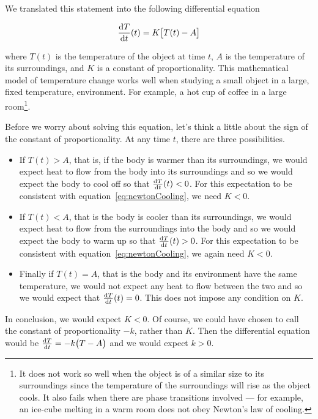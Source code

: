 We translated this statement into the following differential equation
\begin{impeqn}\label{eq:newtonCooling}
 \begin{align*}
\diff{T}{t}(t) = K\big[T(t)-A\big]
\end{align*}
\end{impeqn}
\noindent where $T(t)$ is the temperature of the object at time $t$, $A$ is the
temperature of its surroundings, and $K$ is a constant of proportionality. This
mathematical model of temperature change works well when studying a small object
in a large, fixed temperature, environment. For example, a hot cup of coffee in
a large room\footnote{It does not work so well when the object is of a similar
size to its surroundings since the temperature of the surroundings will rise as
the object cools. It also fails when there are phase transitions involved ---
for example, an ice-cube melting in a warm room does not obey Newton's law of
cooling.}.



Before we worry about solving this equation, let's think a little about the sign of the
constant of proportionality. At any time $t$, there are three possibilities.
\begin{itemize}
  \item  If $T(t)>A$, that is, if the body is warmer than its surroundings,
         we would expect heat to flow from the body into its surroundings
         and so we would expect the body to cool off so that
         $\diff{T}{t}(t)<0$. For this
         expectation to be consistent with equation~\eqref{eq:newtonCooling},
         we need $K<0$.
  \item  If $T(t)<A$, that is the body is cooler than its surroundings,
         we would expect heat to flow from the surroundings into the body
         and so we would expect the body to warm up so that
         $\diff{T}{t}(t)>0$. For this
         expectation to be consistent with equation~\eqref{eq:newtonCooling},
         we again need $K<0$.
  \item  Finally if $T(t)=A$, that is the body and its environment have
         the same temperature, we would not expect any heat to flow between
         the two and so we would expect that $\diff{T}{t}(t)=0$. This
         does not impose any condition on $K$.
\end{itemize}
In conclusion, we would expect $K<0$. Of course, we could have chosen to
call the constant of proportionality $-k$, rather than $K$. Then the
differential equation would be  $\diff{T}{t} = -k\big(T-A\big)$
and we would expect $k>0$.

